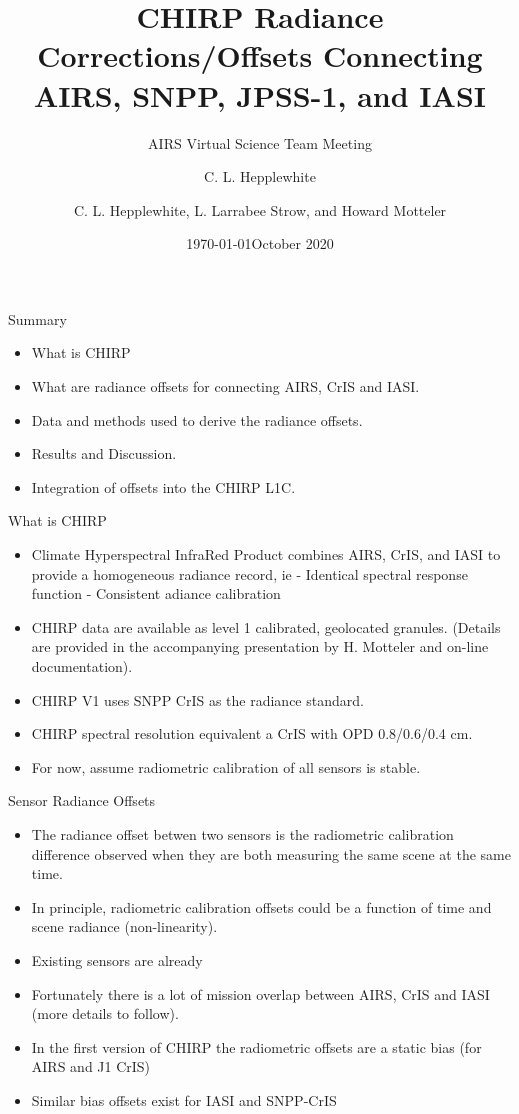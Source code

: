 \documentclass[10pt,t]{beamer}
\author{C. L. Hepplewhite}
\date{\today}
\title{\large CHIRP Radiance Corrections/Offsets Connecting AIRS, SNPP, JPSS-1, and IASI}
\subtitle{\footnotesize{AIRS Virtual Science Team Meeting}}
\date{\vspace{0.1in}\footnotesize{October 2020 \vfill}}
\author{C. L. Hepplewhite\inst{1,2}, L. Larrabee Strow\inst{1,2}, and Howard Motteler\inst{2} }
\institute[UMBC]{\inst{1} UMBC Physics Dept. \and \inst{2}UMBC JCET}
\begin{document}
\maketitle

\begin{frame}{Summary}
\begin{itemize}
  \item What is CHIRP
  \item What are radiance offsets for connecting AIRS, CrIS and IASI.
  \item Data and methods used to derive the radiance offsets.
  \item Results and Discussion.
  \item Integration of offsets into the CHIRP L1C.
    
\end{itemize}

\end{frame}
\begin{frame}{What is CHIRP}

  \begin{itemize}
  \item Climate Hyperspectral InfraRed Product combines AIRS, CrIS, and IASI to provide a homogeneous radiance record, ie
    -  Identical spectral response function
    -  Consistent adiance calibration
  \item CHIRP data are available as level 1 calibrated, geolocated granules.
    (Details are provided in the accompanying presentation by H. Motteler and on-line documentation).
  \item CHIRP V1 uses SNPP CrIS as the radiance standard.
  \item CHIRP spectral resolution equivalent a CrIS with OPD 0.8/0.6/0.4 cm.  
  \item For now, assume radiometric calibration of all sensors is stable.
  \end{itemize}
  

\end{frame}
\begin{frame}{Sensor Radiance Offsets}

  \begin{itemize}
  \item The radiance offset betwen two sensors is the radiometric calibration
    difference observed when they are both measuring the same scene at the same time.
  \item In principle, radiometric calibration offsets could be a function of time and scene radiance (non-linearity).
  \item Existing sensors are already 
  \item Fortunately there is a lot of mission overlap between AIRS, CrIS and IASI
    (more details to follow).
  \item In the first version of CHIRP the radiometric offsets are a static bias (for AIRS and J1 CrIS)
  \item Similar bias offsets exist for IASI and SNPP-CrIS 
  \end{itemize}

\end{frame}
\end{document}
